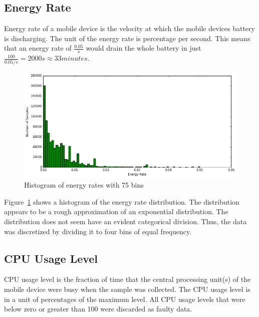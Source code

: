 \subsection{Energy Rate}

Energy rate of a mobile device is the velocity at which the mobile devices battery is discharging. The unit of the energy rate is percentage per second. This means that an energy rate of $\frac{0.05}{s}$ would drain the whole battery in just $\frac{100}{0.05 / s} = 2000 s \approx 33 minutes$.

\begin{figure} %
	\centering
	\includegraphics[width=\textwidth]{images/carat-data/energy_rate.png}
	\caption{Histogram of energy rates with 75 bins}
	\label{figure:carat-data-energy-rate}
\end{figure}  

Figure~\ref{figure:carat-data-energy-rate} shows a histogram of the energy rate distribution. The distribution appears to be a rough approximation of an exponential distribution. The distribution does not seem have an evident categorical division. Thus, the data was discretized by dividing it to four bins of equal frequency. 

\subsection{CPU Usage Level} \label{carat data cpu} 

CPU usage level is the fraction of time that the central processing unit(s) of the mobile device were busy when the sample was collected. The CPU usage level is in a unit of percentages of the maximum level. All CPU usage levels that were below zero or greater than 100 were discarded as faulty data.

